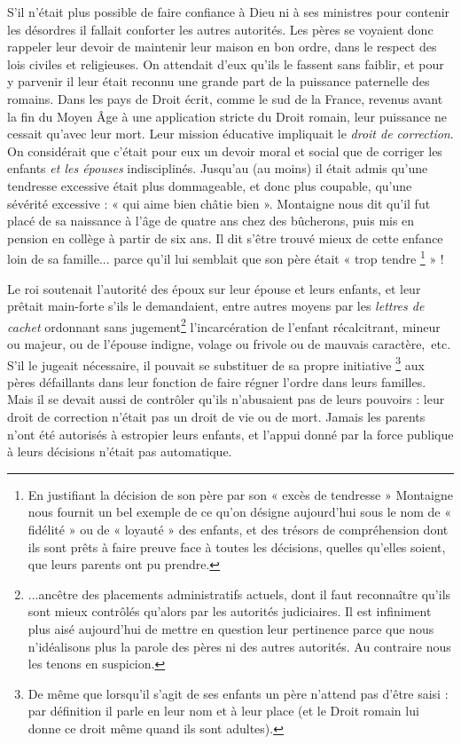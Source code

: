     
    S'il n'était plus possible de faire confiance à Dieu ni à ses ministres pour contenir les désordres il fallait conforter les autres autorités. Les pères se voyaient donc rappeler leur devoir de maintenir leur maison en bon ordre, dans le respect des lois civiles et religieuses. On attendait d'eux qu'ils le fassent sans faiblir, et pour y parvenir il leur était reconnu une grande part de la puissance paternelle des romains. Dans les pays de Droit écrit, comme le sud de la France, revenus avant la fin du Moyen Âge à une application stricte du Droit romain, leur puissance ne cessait qu'avec leur mort. Leur mission éducative impliquait le \emph{droit de correction}. On considérait que c'était pour eux un devoir moral et social que de corriger les enfants \emph{et les épouses} indisciplinés. Jusqu'au  (au moins) il était admis qu'une tendresse excessive était plus dommageable, et donc plus coupable, qu'une sévérité excessive : « {qui aime bien châtie bien} ». Montaigne nous dit qu'il fut placé de sa naissance à l'âge de quatre ans chez des bûcherons, puis mis en pension en collège à partir de six ans. Il dit s'être trouvé mieux de cette enfance loin de sa famille... parce qu'il lui semblait que son père était « trop tendre%
\footnote{En justifiant la décision de son père par son « excès de tendresse » Montaigne nous fournit un bel exemple de ce qu'on désigne aujourd'hui sous le nom de « fidélité » ou de « loyauté » des enfants, et des trésors de compréhension dont ils sont prêts à faire preuve face à toutes les décisions, quelles qu'elles soient, que leurs parents ont pu prendre.} 
» !

 Le roi soutenait l'autorité des époux sur leur épouse et leurs enfants, et leur prêtait main-forte s'ils le demandaient, entre autres moyens par les \emph{lettres de cachet} ordonnant sans jugement\footnote{...ancêtre des placements administratifs actuels, dont il faut reconnaître qu'ils sont mieux contrôlés qu'alors par les autorités judiciaires. Il est infiniment plus aisé aujourd'hui de mettre en question leur pertinence parce que nous n'idéalisons plus la parole des pères ni des autres autorités. Au contraire nous les tenons en suspicion.} l'incarcération de l'enfant récalcitrant, mineur ou majeur, ou de l'épouse indigne, volage ou frivole ou de mauvais caractère,~etc. S'il le jugeait nécessaire, il pouvait se substituer de sa propre initiative%
\footnote{De même que lorsqu'il s'agit de ses enfants un père n'attend pas d'être saisi : par définition il parle en leur nom et à leur place (et le Droit romain lui donne ce droit même quand ils sont adultes).} 
aux pères défaillants dans leur fonction de faire régner l'ordre dans leurs familles. 
 Mais il se devait aussi de contrôler qu'ils n'abusaient pas de leurs pouvoirs : leur droit de correction n'était pas un droit de vie ou de mort. Jamais les parents n'ont été autorisés à estropier leurs enfants, et l'appui donné par la force publique à leurs décisions n'était pas automatique.

